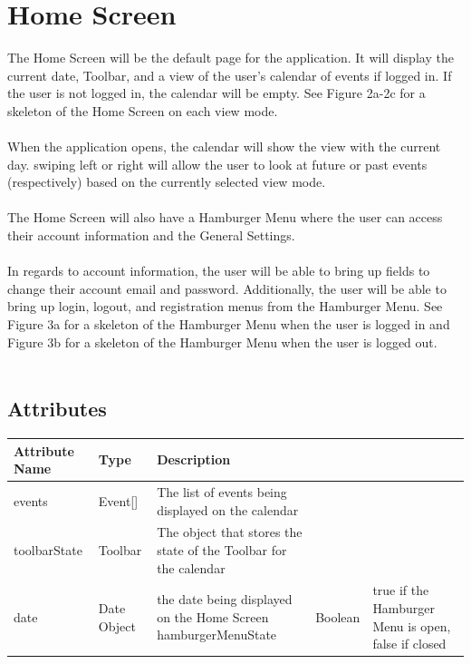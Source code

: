 \documentclass{scrreprt}
\begin{document}
\section{Home Screen}

The Home Screen will be the default page for the application.  It will display the current date, Toolbar, and a view of the user's calendar of events if logged in.  If the user is not logged in, the calendar will be empty. See Figure 2a-2c for a skeleton of the Home Screen on each view mode.\\
\\
When the application opens, the calendar will show the view with the current day.  swiping left or right will allow the user to look at future or past events (respectively) based on the currently selected view mode.\\
\\
The Home Screen will also have a Hamburger Menu where the user can access their account information and the General Settings.\\
\\
In regards to account information, the user will be able to bring up fields to change their account email and password.  Additionally, the user will be able to bring up login, logout, and registration menus from the Hamburger Menu.  See Figure 3a for a skeleton of the Hamburger Menu when the user is logged in and Figure 3b for a skeleton of the Hamburger Menu when the user is logged out.\\
\\

\subsection{Attributes}

\begin{center}
\begin{longtable}{ | p{5cm} | p{5cm} | p{5cm} | }
\hline
\textbf{Attribute Name} & \textbf{Type} & \textbf{Description} \\
\hline
events & Event[] & The list of events being displayed on the calendar \\
\hline
toolbarState & Toolbar & The object that stores the state of the Toolbar for the calendar \\
\hline
date & Date Object & the date being displayed on the Home Screen
\hline
hamburgerMenuState & Boolean & true if the Hamburger Menu is open, false if closed \\
\hline
\end{longtable}
\end{center}
\end{document}
